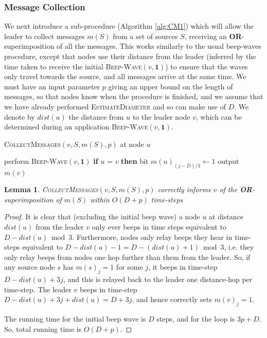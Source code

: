 \documentclass{article}
\newtheorem{lemma}[theorem]{Lemma}
\begin{document}
\subsubsection{Message Collection}

We next introduce a sub-procedure (Algorithm \ref{alg:CM1}) which will allow the leader to collect messages $m(S)$ from a set of sources $S$, receiving an \textbf{OR}-superimposition of all the messages. This works similarly to the usual beep-waves procedure, except that nodes use their distance from the leader (inferred by the time taken to receive the initial \textsc{Beep-Wave}$(v,\textbf{1})$) to ensure that the waves only travel towards the source, and all messages arrive at the same time. We must have an input parameter $p$ giving an upper bound on the length of messages, so that nodes know when the procedure is finished, and we assume that we have already performed \textsc{EstimateDiameter} and so can make use of $D$. We denote by $dist(u)$ the distance from $u$ to the leader node $v$, which can be determined during an application \textsc{Beep-Wave}$(v,\textbf{1})$.

\begin{algorithm}
	\caption{\textsc{CollectMessages}$(v,S,m(S),p)$ at node $u$}
	\label{alg:CM1}
	\begin{algorithmic}
		\State perform \textsc{Beep-Wave}$(v,\textbf{1})$
		\State \textbf{if} $u$ = $v$ \textbf{then} bit $m(u)_{(j-D)/3} \gets 1$
		\EndIf
		\EndFor
		\State output $m(v)$
	\end{algorithmic}
\end{algorithm}

\begin{lemma}
	\textsc{CollectMessages}$(v,S,m(S),p)$ correctly informs $v$ of the \textbf{OR}-superimposition of $m(S)$ within $O(D+p)$ time-steps
\end{lemma}

\begin{proof}
	It is clear that (excluding the initial beep wave) a node $u$ at distance $dist(u)$ from the leader $v$ only ever beeps in time steps equivalent to $D-dist(u) \bmod 3$. Furthermore, nodes only relay beeps they hear in time-steps equivalent to $D-dist(u)-1 = D-(dist(u)+1) \bmod 3$, i.e. they only relay beeps from nodes one hop further than them from the leader. So, if any source node $s$ has $m(s)_j=1$ for some $j$, it beeps in time-step $D-dist(u)+3j$, and this is relayed back to the leader one distance-hop per time-step. The leader $v$ beeps in time-step $D-dist(u)+3j+dist(u)=D+3j$, and hence correctly sets $m(v)_j=1$.
	
	The running time for the initial beep wave is $D$ steps, and for the loop is $3p+D$. So, total running time is $O(D+p)$.
\end{proof}
\end{document}
